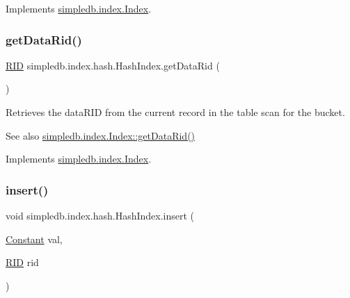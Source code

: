 Implements \hyperlink{interfacesimpledb_1_1index_1_1Index_a3bbe4098bf5422023391ce24f2e7df88}{simpledb.\+index.\+Index}.

\mbox{\label{classsimpledb_1_1index_1_1hash_1_1HashIndex_ae8318b51f79a93009bcf9806aacda405}} 
\subsubsection{\texorpdfstring{get\+Data\+Rid()}{getDataRid()}}
{\footnotesize\ttfamily \hyperlink{classsimpledb_1_1record_1_1RID}{R\+ID} simpledb.\+index.\+hash.\+Hash\+Index.\+get\+Data\+Rid (\begin{DoxyParamCaption}{ }\end{DoxyParamCaption})\hspace{0.3cm}{\ttfamily [inline]}}

Retrieves the data\+R\+ID from the current record in the table scan for the bucket. \begin{DoxySeeAlso}{See also}
\hyperlink{interfacesimpledb_1_1index_1_1Index_aad4ee85740a0f5b3453bdf24e8b82615}{simpledb.\+index.\+Index\+::get\+Data\+Rid()} 
\end{DoxySeeAlso}


Implements \hyperlink{interfacesimpledb_1_1index_1_1Index_aad4ee85740a0f5b3453bdf24e8b82615}{simpledb.\+index.\+Index}.

\mbox{\label{classsimpledb_1_1index_1_1hash_1_1HashIndex_a8fd2cc37db3d7b254658fdd4b2814f40}} 
\subsubsection{\texorpdfstring{insert()}{insert()}}
{\footnotesize\ttfamily void simpledb.\+index.\+hash.\+Hash\+Index.\+insert (\begin{DoxyParamCaption}\item[{\hyperlink{classsimpledb_1_1query_1_1Constant}{Constant}}]{val,  }\item[{\hyperlink{classsimpledb_1_1record_1_1RID}{R\+ID}}]{rid }\end{DoxyParamCaption})\hspace{0.3cm}{\ttfamily [inline]}}

